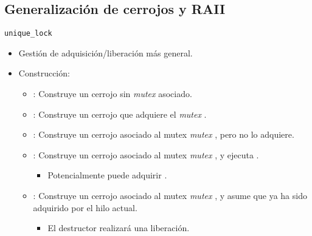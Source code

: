\subsection{Generalización de cerrojos y RAII}

\begin{frame}{\texttt{unique\_lock}}
\begin{itemize}
  \item Gestión de adquisición/liberación más general.
  \item Construcción:
    \begin{itemize}
      \item {}: Construye un cerrojo sin \emph{mutex} asociado.
      \item {}: Construye un cerrojo que adquiere el \emph{mutex} .
      \item {}: Construye un cerrojo asociado al mutex \emph{mutex} , pero no lo adquiere.
      \item {}: Construye un cerrojo asociado al mutex \emph{mutex} , y ejecuta .
        \begin{itemize}
          \item Potencialmente puede adquirir .
        \end{itemize}
      \item {}: Construye un cerrojo asociado al mutex \emph{mutex} , y asume que ya ha sido adquirido por el hilo actual.
        \begin{itemize}
          \item El destructor realizará una liberación.
        \end{itemize}
    \end{itemize}
\end{itemize}
\end{frame}

